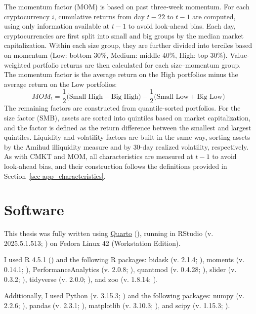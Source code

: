 \documentclass[
  12pt,
  a4paper,
  openany]{scrbook}
\begin{document}
The momentum factor (MOM) is based on past three-week momentum. For each
cryptocurrency \(i\), cumulative returns from day \(t-22\) to \(t-1\)
are computed, using only information available at \(t-1\) to avoid
look-ahead bias. Each day, cryptocurrencies are first split into small
and big groups by the median market capitalization. Within each size
group, they are further divided into terciles based on momentum (Low:
bottom 30\%, Medium: middle 40\%, High: top 30\%). Value-weighted
portfolio returns are then calculated for each size--momentum group. The
momentum factor is the average return on the High portfolios minus the
average return on the Low portfolios: \[
MOM_t = \frac{1}{2}\big(\text{Small High} + \text{Big High}\big) 
       - \frac{1}{2}\big(\text{Small Low} + \text{Big Low}\big)
\] The remaining factors are constructed from quantile-sorted
portfolios. For the size factor (SMB), assets are sorted into quintiles
based on market capitalization, and the factor is defined as the return
difference between the smallest and largest quintiles. Liquidity and
volatility factors are built in the same way, sorting assets by the
Amihud illiquidity measure and by 30-day realized volatility,
respectively. As with CMKT and MOM, all characteristics are measured at
\(t-1\) to avoid look-ahead bias, and their construction follows the
definitions provided in Section~\ref{sec-app_characteristics}.

\section{Software}\label{sec-software}

This thesis was fully written using \href{https://quarto.org/}{Quarto}
(), running in RStudio
(v. 2025.5.1.513; ) on Fedora
Linux 42 (Workstation Edition).

I used R 4.5.1 () and the
following R packages: bidask (v. 2.1.4; ), moments (v. 0.14.1; ), PerformanceAnalytics (v. 2.0.8;
), quantmod
(v. 0.4.28; ), slider (v.
0.3.2; ), tidyverse (v. 2.0.0;
), and zoo (v. 1.8.14;
).

Additionally, I used Python (v. 3.15.3; ) and the following packages: numpy (v. 2.2.6;
), pandas (v. 2.3.1;
),
matplotlib (v. 3.10.3; ), and
scipy (v. 1.15.3; ).


\backmatter
\end{document}
